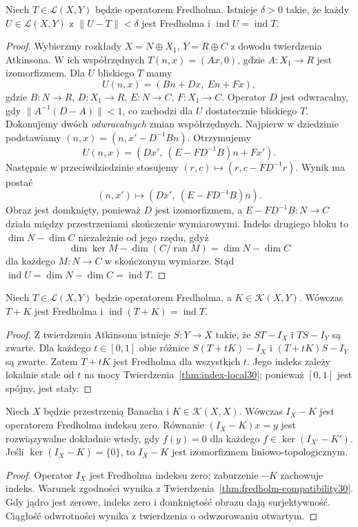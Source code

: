 \begin{twierdzenie}
\label{thm:index-local30}
Niech $T\in\mathcal L(X,Y)$ będzie operatorem Fredholma.
Istnieje $\delta>0$ takie, że każdy $U\in\mathcal L(X,Y)$
z $\|U-T\|<\delta$ jest Fredholma i
$\operatorname{ind}U=\operatorname{ind}T$.
\end{twierdzenie}
\begin{proof}
Wybierzmy rozkłady $X=N\oplus X_1$, $Y=R\oplus C$
z dowodu twierdzenia Atkinsona. W ich współrzędnych
$T(n,x)=(Ax,0)$, gdzie $A:X_1\to R$ jest izomorfizmem.
Dla $U$ bliskiego $T$ mamy
\[U(n,x)=(Bn+Dx,\ En+Fx),\]
gdzie $B:N\to R$, $D:X_1\to R$, $E:N\to C$,
$F:X_1\to C$. Operator $D$ jest odwracalny, gdy
$\|A^{-1}(D-A)\|<1$, co zachodzi dla $U$ dostatecznie
bliskiego $T$.
Dokonujemy dwóch \emph{odwracalnych} zmian współrzędnych.
Najpierw w dziedzinie podstawiamy
$(n,x)=(n,x'-D^{-1}Bn)$. Otrzymujemy
\[U(n,x)=(Dx',\ (E-FD^{-1}B)n+Fx').\]
Następnie w przeciwdziedzinie stosujemy
$(r,c)\mapsto(r,c-FD^{-1}r)$. Wynik ma postać
\[(n,x')\mapsto(Dx',\ (E-FD^{-1}B)n).\]
Obraz jest domknięty, ponieważ $D$ jest izomorfizmem,
a $E-FD^{-1}B:N\to C$ działa między przestrzeniami
skończenie wymiarowymi. Indeks drugiego bloku to
$\dim N-\dim C$ niezależnie od jego rzędu, gdyż
\[\dim\ker M-\dim(C/\operatorname{ran}M)=\dim N-\dim C\]
dla każdego $M:N\to C$ w skończonym wymiarze.
Stąd $\operatorname{ind}U=\dim N-\dim C=\operatorname{ind}T$.
\end{proof}

\begin{twierdzenie}
\label{thm:index-compact-perturb30}
Niech $T\in\mathcal L(X,Y)$ będzie operatorem Fredholma,
a $K\in\mathcal K(X,Y)$. Wówczas $T+K$ jest Fredholma i
$\operatorname{ind}(T+K)=\operatorname{ind}T$.
\end{twierdzenie}
\begin{proof}
Z twierdzenia Atkinsona istnieje $S:Y\to X$ takie, że
$ST-I_X$ i $TS-I_Y$ są zwarte. Dla każdego $t\in[0,1]$
obie różnice $S(T+tK)-I_X$ i $(T+tK)S-I_Y$ są zwarte.
Zatem $T+tK$ jest Fredholma dla wszystkich $t$.
Jego indeks zależy lokalnie stale od $t$ na mocy
Twierdzenia~\ref{thm:index-local30}; ponieważ $[0,1]$
jest spójny, jest stały.
\end{proof}

\begin{wniosek}
\label{cor:fredholm-banach30}
Niech $X$ będzie przestrzenią Banacha i
$K\in\mathcal K(X,X)$. Wówczas $I_X-K$ jest operatorem
Fredholma indeksu zero. Równanie $(I_X-K)x=y$ jest
rozwiązywalne dokładnie wtedy, gdy $f(y)=0$ dla każdego
$f\in\ker(I_{X'}-K')$. Jeśli $\ker(I_X-K)=\{0\}$,
to $I_X-K$ jest izomorfizmem liniowo-topologicznym.
\end{wniosek}
\begin{proof}
Operator $I_X$ jest Fredholma indeksu zero; zaburzenie
$-K$ zachowuje indeks. Warunek zgodności wynika z
Twierdzenia~\ref{thm:fredholm-compatibility30}. Gdy jądro
jest zerowe, indeks zero i domkniętość obrazu dają
surjektywność. Ciągłość odwrotności wynika z twierdzenia
o odwzorowaniu otwartym.
\end{proof}


